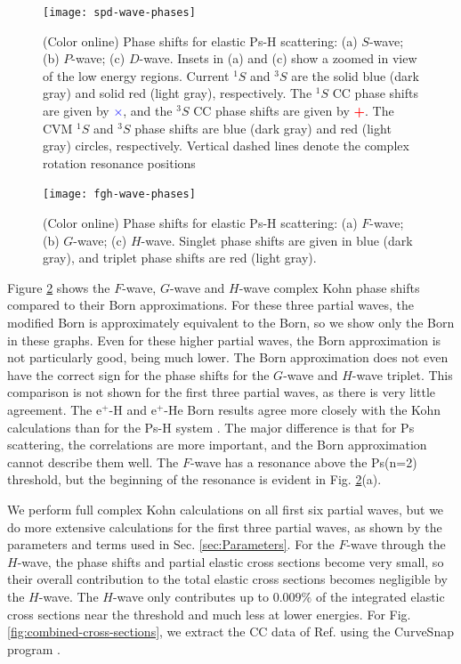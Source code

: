 \documentclass[preprint,showpacs,showkeys,preprintnumbers,amsmath,amssymb,longbibliography,pra,aps]{revtex4-1}
\begin{document}
\begin{figure}[H]
	\centering
	\texttt{[image: spd-wave-phases]}
	\caption{(Color online) Phase shifts for elastic Ps-H scattering: (a) $S$-wave;
(b) $P$-wave; (c) $D$-wave. Insets in (a) and (c) show a zoomed in view of 
the low energy regions. Current $^1S$ and $^3S$ are the solid blue (dark gray)
 and solid red (light gray), respectively. The $^1S$ CC phase shifts
\cite{Walters2004} are given by \mbox{\textcolor{blue}{$\times$}}, and the
$^3S$ CC phase shifts \cite{Blackwood2002} are given by
\mbox{\textcolor{red}{\textbf{+}}}. The CVM $^1S$ and $^3S$ phase shifts
\cite{Zhang2012} are blue (dark gray) and red (light gray) circles,
respectively. Vertical dashed lines denote the complex rotation resonance
positions \cite{Yan1999,Yan1998a,Ho1998}}
	\label{fig:spd-wave-phases}
\end{figure}

\begin{figure}[H]
	\centering
	\texttt{[image: fgh-wave-phases]}
	\caption{(Color online) Phase shifts for elastic Ps-H scattering:
(a) $F$-wave; (b) $G$-wave; (c) $H$-wave. Singlet phase shifts are given in blue
(dark gray), and triplet phase shifts are red (light gray).}
	\label{fig:fgh-wave-phases}
\end{figure}

Figure \ref{fig:fgh-wave-phases} shows the $F$-wave, $G$-wave and $H$-wave complex 
Kohn phase shifts compared to their Born approximations. For these three 
partial waves, the modified Born is approximately equivalent to the Born, so 
we show only the Born in these graphs. Even for these higher partial waves, 
the Born approximation is not particularly good, being much lower. The Born 
approximation does not even have the correct sign for the phase shifts for 
the $G$-wave and $H$-wave triplet. This comparison is not shown for the first 
three partial waves, as there is very little agreement. The e$^+$-H and
e$^+$-He Born results agree more closely with the Kohn calculations than
for the Ps-H system \cite{VanReeth2014}. The major difference is that for Ps
scattering, the correlations are more important, and the Born approximation
cannot describe them well. The $F$-wave has a resonance above the Ps(n=2)
threshold, but the beginning of the resonance is evident in Fig.
\ref{fig:fgh-wave-phases}(a).

We perform full complex Kohn calculations on all first six partial waves, but 
we do more extensive calculations for the first three partial waves, as shown 
by the parameters and terms used in Sec. \ref{sec:Parameters}. For the $F$-wave 
through the $H$-wave, the phase shifts and partial elastic cross sections 
become very small, so their overall contribution to the total elastic cross 
sections becomes negligible by the $H$-wave. The $H$-wave only contributes up to
$0.009\%$ of the integrated elastic cross sections near the threshold and much 
less at lower energies. For Fig. \ref{fig:combined-cross-sections}, we 
extract the CC data of Ref. \cite{Walters2004} using the CurveSnap program 
\cite{CurveSnap}.
\end{document}
